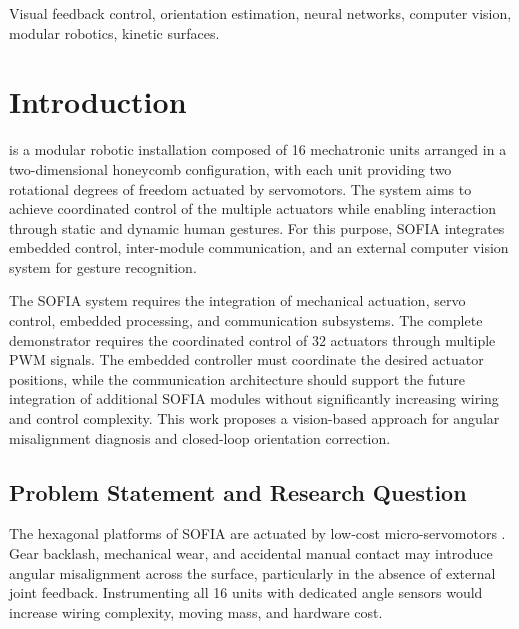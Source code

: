 \documentclass[lettersize,journal]{IEEEtran}
\begin{document}
	
	\begin{IEEEkeywords}
		Visual feedback control, orientation estimation, neural networks, computer vision, modular robotics, kinetic surfaces.
	\end{IEEEkeywords}
	
	
	\section{Introduction}
	
	\label{sec:intro}
	
	 is a modular robotic installation composed of 16
	mechatronic units arranged in a two-dimensional honeycomb configuration, with each
	unit providing two rotational degrees of freedom actuated by servomotors. The
	system aims to achieve coordinated control of the multiple actuators while
	enabling interaction through static and dynamic human gestures. For this
	purpose, SOFIA integrates embedded control, inter-module communication, and an
	external computer vision system for gesture recognition.
	
	The SOFIA system requires the
	integration of mechanical actuation, servo control, embedded processing, and
	communication subsystems. The complete demonstrator
	requires the coordinated control of 32 actuators through
	multiple PWM signals. The embedded controller must coordinate
	the desired actuator positions, while the communication architecture should
	support the future integration of additional SOFIA modules without
	significantly increasing wiring and control complexity. This work proposes a vision-based approach for angular misalignment diagnosis and closed-loop orientation correction.
	
	\subsection{Problem Statement and Research Question}
	The hexagonal platforms of SOFIA are actuated by low-cost micro-servomotors \cite{sofia_architecture}. Gear backlash, mechanical wear, and accidental manual contact may introduce angular misalignment across the surface, particularly in the absence of external joint feedback. Instrumenting all 16 units with dedicated angle sensors would increase wiring complexity, moving mass, and hardware cost.
	
\end{document}
